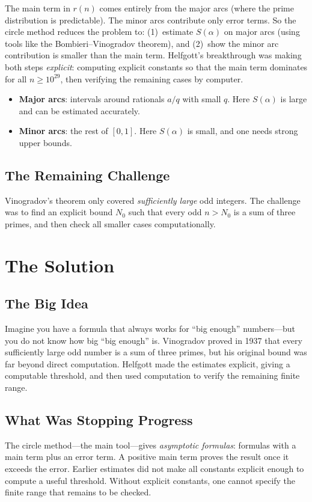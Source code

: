 The main term in $r(n)$ comes entirely from the major arcs (where the prime distribution is predictable). The minor arcs contribute only error terms. So the circle method reduces the problem to: (1)~estimate $S(\alpha)$ on major arcs (using tools like the Bombieri--Vinogradov theorem), and (2)~show the minor arc contribution is smaller than the main term. Helfgott's breakthrough was making both steps \emph{explicit}: computing explicit constants so that the main term dominates for all $n \geq 10^{29}$, then verifying the remaining cases by computer.
\begin{itemize}
\item \textbf{Major arcs}: intervals around rationals $a/q$ with small $q$. Here $S(\alpha)$ is large and can be estimated accurately.
\item \textbf{Minor arcs}: the rest of $[0,1]$. Here $S(\alpha)$ is small, and one needs strong upper bounds.
\end{itemize}

\subsection{The Remaining Challenge}

Vinogradov's theorem only covered \emph{sufficiently large} odd integers. The challenge was to find an explicit bound $N_0$ such that every odd $n > N_0$ is a sum of three primes, and then check all smaller cases computationally.

\section{The Solution}

\subsection{The Big Idea}
Imagine you have a formula that always works for ``big enough'' numbers---but you do not know how big ``big enough'' is. Vinogradov proved in 1937 that every sufficiently large odd number is a sum of three primes, but his original bound was far beyond direct computation. Helfgott made the estimates explicit, giving a computable threshold, and then used computation to verify the remaining finite range.

\subsection{What Was Stopping Progress}
The circle method---the main tool---gives \emph{asymptotic formulas}: formulas with a main term plus an error term. A positive main term proves the result once it exceeds the error. Earlier estimates did not make all constants explicit enough to compute a useful threshold. Without explicit constants, one cannot specify the finite range that remains to be checked.

